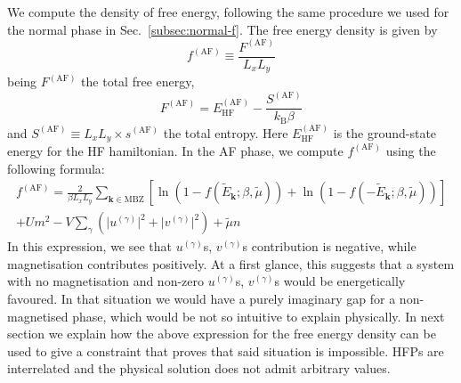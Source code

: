 We compute the density of free energy, following the same procedure we used for the normal phase in Sec.~\ref{subsec:normal-f}. The free energy density is given by
\begin{equation}\label{eq:af-fMFT-def}
	f^{(\mathrm{AF})} \equiv \frac{F^{(\mathrm{AF})}}{L_x L_y}
\end{equation}
being $F^{(\mathrm{AF})}$ the total free energy,
\begin{equation}\label{eq:af-FMFT-def}
	F^{(\mathrm{AF})} = E_\mathrm{HF}^{(\mathrm{AF})} - \frac{S^{(\mathrm{AF})}}{k_\mathrm{B} \beta}
\end{equation}
and $S^{(\mathrm{AF})} \equiv  L_x L_y \times s^{(\mathrm{AF})}$ the total entropy. Here $E_\mathrm{HF}^{(\mathrm{AF})}$ is the ground-state energy for the HF hamiltonian. In the AF phase, we compute $f^{(\mathrm{AF})}$ using the following formula:
\begin{multline}
	f^{(\mathrm{AF})} = \frac{2}{\beta L_x L_y} \sum_{\mathbf{k}\in\mathrm{MBZ}} \left[
	\ln \left(
	1- f( \tilde{E}_\mathbf{k}; \beta,\tilde{\mu}) 
	\right) + \ln \left(
	1- f( -\tilde{E}_\mathbf{k}; \beta,\tilde{\mu}) 
	\right)
	\right] \\
	+ U m^2 - V \sum_{\gamma} \left(	\big|u^{(\gamma)}\big|^2 + \big|v^{(\gamma)}\big|^2
	\right) + \tilde{\mu} n 
	\label{eq:af-fMFT}
\end{multline}
In this expression, we see that $u^{(\gamma)}$s, $v^{(\gamma)}$s contribution is negative, while magnetisation contributes positively. At a first glance, this suggests that a system with no magnetisation and non-zero $u^{(\gamma)}$s, $v^{(\gamma)}$s would be energetically favoured. In that situation we would have a purely imaginary gap for a non-magnetised phase, which would be not so intuitive to explain physically. In next section we explain how the above expression for the free energy density can be used to give a constraint that proves that said situation is impossible. HFPs are interrelated and the physical solution does not admit arbitrary values.

